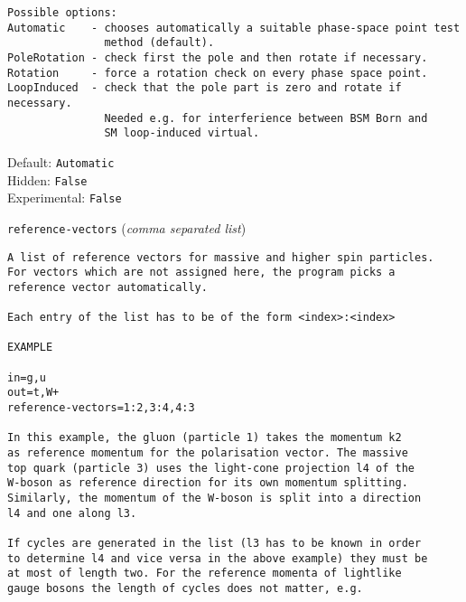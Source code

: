\begin{basedescript}{\desclabelstyle{\pushlabel}}
\begin{verbatim}
Possible options:
Automatic    - chooses automatically a suitable phase-space point test
               method (default).
PoleRotation - check first the pole and then rotate if necessary.
Rotation     - force a rotation check on every phase space point.
LoopInduced  - check that the pole part is zero and rotate if necessary.
               Needed e.g. for interferience between BSM Born and
               SM loop-induced virtual.
\end{verbatim}
Default: \verb|Automatic|
\\Hidden: \verb|False|
\\Experimental: \verb|False|
\\\item[\colorbox{gray!30}{\texttt{reference-vectors}}] (\textit{comma separated list})
\begin{verbatim}
A list of reference vectors for massive and higher spin particles.
For vectors which are not assigned here, the program picks a
reference vector automatically.

Each entry of the list has to be of the form <index>:<index>

EXAMPLE

in=g,u
out=t,W+
reference-vectors=1:2,3:4,4:3

In this example, the gluon (particle 1) takes the momentum k2
as reference momentum for the polarisation vector. The massive
top quark (particle 3) uses the light-cone projection l4 of the
W-boson as reference direction for its own momentum splitting.
Similarly, the momentum of the W-boson is split into a direction
l4 and one along l3.

If cycles are generated in the list (l3 has to be known in order
to determine l4 and vice versa in the above example) they must be
at most of length two. For the reference momenta of lightlike
gauge bosons the length of cycles does not matter, e.g.


\end{verbatim}
\end{basedescript}
